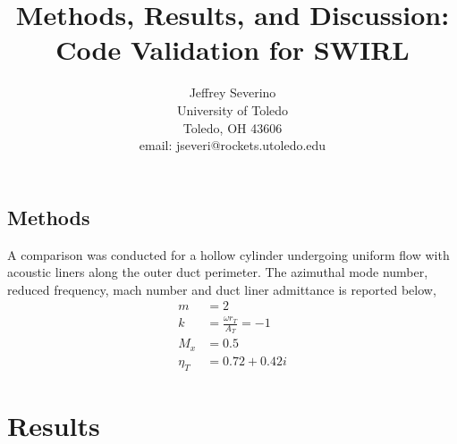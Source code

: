 \documentclass[a4paper]{article}
\begin{document}
\begin{titlepage}

    \title{
    Methods, Results, and Discussion: Code Validation for SWIRL}


    \author{ Jeffrey Severino \\
        University of Toledo \\
        Toledo, OH  43606 \\
    email: jseveri@rockets.utoledo.edu}


    \maketitle

\end{titlepage}
\subsection{Methods}
A comparison was conducted for a hollow cylinder undergoing uniform flow with
acoustic liners along the outer duct perimeter. The azimuthal mode number, reduced 
frequency, mach number and duct liner admittance is reported below,
\begin{align*}
    m &= 2 \\
    k &= \frac{\omega r_T}{A_T} = -1 \\
    M_x &= 0.5 \\
    \eta_T &= 0.72 + 0.42i
\end{align*} 

\section{Results}
\end{document}
